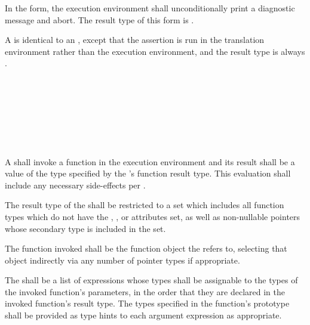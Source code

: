 \specsubsubitem
In the  form, the execution environment shall unconditionally
print a diagnostic message and abort. The result type of this form is
.

\specsubsubitem
A  is identical to an
, except that the assertion is run in the
translation environment rather than the execution environment, and the result
type is always .


\begin{grammar}
 \\
	 \terminal{(}  \terminal{)} \\

 \\
	 \optional{\terminal{,}} \\
	  \optional{\terminal{,}} \\
	 \terminal{,}  \\
\end{grammar}

\specsubsubitem
A  shall invoke a function in the execution
environment and its result shall be a value of the type specified by the
's function result type. This evaluation shall
include any necessary side-effects per .

\specsubsubitem
The result type of the  shall be restricted to a
set which includes all function types which do not have the ,
, or  attributes set, as well as non-nullable
pointers whose secondary type is included in the set.


\specsubsubitem
The function invoked shall be the function object the
 refers to, selecting that object indirectly via
any number of pointer types if appropriate.

\specsubsubitem
The  shall be a list of expressions whose types
shall be assignable to the types of the invoked function's parameters, in the
order that they are declared in the invoked function's result type. The types
specified in the function's prototype shall be provided as type hints to each
argument expression as appropriate.

